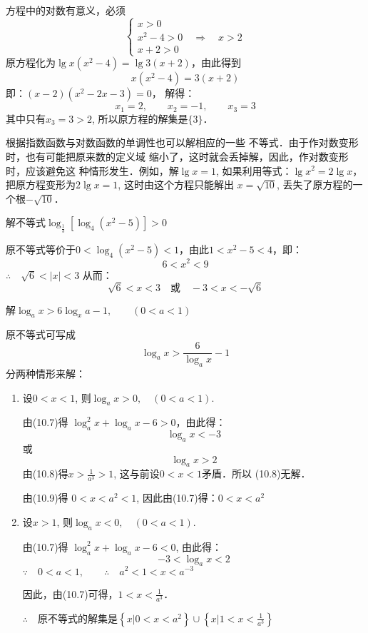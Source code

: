 \begin{solution}
  方程中的对数有意义，必须
    \[\begin{cases}
  x>0\\
  x^2-4>0\quad \Rightarrow\quad  x>2\\
  x+2>0
\end{cases}\]
原方程化为$\lg x(x^2-4)=\lg 3(x+2)$，由此得到
\[x(x^2-4)=3(x+2)\]
即：$(x-2)(x^2-2x-3)=0$，
解得：
\[x_1=2,\qquad x_2=-1,\qquad x_3=3\]
其中只有$x_3=3>2$, 所以原方程的解集是$\{3\}$．
\end{solution}

根据指数函数与对数函数的单调性也可以解相应的一些
不等式．由于作对数变形时，也有可能把原来数的定义域
缩小了，这时就会丢掉解，因此，作对数变形时，应该避免这
种情形发生．例如，解$\lg x=1$, 如果利用等式：$\lg x^2
=2\lg x$，
把原方程变形为$2\lg x=1$, 这时由这个方程只能解出
$x=\sqrt{10}$, 丢失了原方程的一个根$-\sqrt{10}$．

\begin{example}
  解不等式$\log_{\tfrac{1}{3}}[\log_4 (x^2-5)]>0$
\end{example}

\begin{solution}
  原不等式等价于$0<\log_4(x^2-5)<1$，由此$1<x^2-5<4$，即：
\[6<x^2<9\]
$\therefore\quad \sqrt{6}<|x|<3$
从而：
\[\sqrt{6}<x<3\quad \text{或}\quad -3<x<-\sqrt{6}\]
\end{solution}

\begin{example}
  解$\log_a x>6\log_x a-1,\qquad (0<a<1)$
\end{example}

\begin{solution}
  原不等式可写成
\begin{equation}
  \log_a x>\frac{6}{\log_a x}-1
\end{equation}
分两种情形来解：
\begin{enumerate}
  \item 设$0<x<1$, 则$\log_a x>0,\quad (0<a<1)$.
  
由(10.7)得 $\log_a^2 x+\log_a x-6>0$，由此得：
\begin{equation}
  \log_a x<-3
\end{equation}
或
\begin{equation}
  \log_a x>2
\end{equation}
由(10.8)得$x>\frac{1}{a^3}>1$, 这与前设$0<x<1$矛盾．所以
(10.8)无解．

由(10.9)得 $0<x<a^2<1$, 因此由(10.7)得：$0<x<a^2$

\item 设$x>1$, 则$\log_a x<0,\quad (0<a<1)$.

由(10.7)得 $\log_a^2 x+\log_a x-6<0$, 由此得：
\[-3<\log_a x<2\]
$\because\quad 0<a<1,\qquad \therefore\quad a^2<1<x<a^{-3}$

因此，由(10.7)可得，$1<x<\frac{1}{a^3}$．

$\therefore\quad $原不等式的解集是$\left\{x|0<x<a^2\right\}\cup\left\{x\Big|1<x<\frac{1}{a^3}\right\}$
\end{enumerate}
\end{solution}

